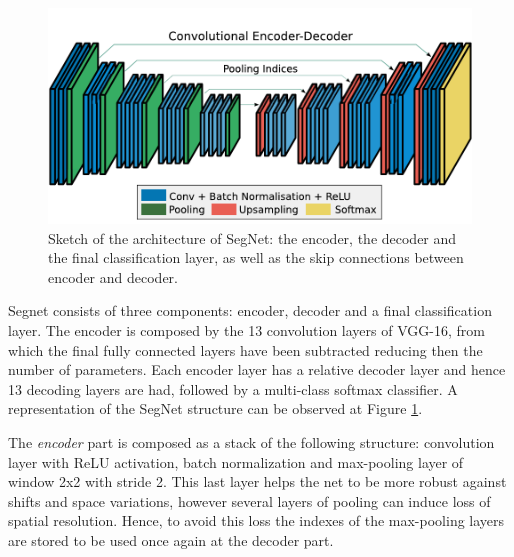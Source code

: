 \begin{figure}[!htbp]
\begin{center}
\includegraphics[scale=0.45]{seg_net.png}
\caption{Sketch of the architecture of SegNet: the encoder, the decoder and the final classification layer, as well as the skip connections between encoder and decoder.}
\label{segnet}
\end{center}
\end{figure}

Segnet consists of three components: encoder, decoder and a final classification layer. The encoder is composed by the 13 convolution layers of VGG-16, from which the final fully connected layers have been subtracted reducing then the number of parameters. Each encoder layer has a relative decoder layer and hence 13 decoding layers are had, followed by a multi-class softmax classifier. A representation of the SegNet structure can be observed at Figure \ref{segnet}.\newline

The \textit{encoder} part is composed as a stack of the following structure: convolution layer with ReLU activation, batch normalization and max-pooling layer of window 2x2 with stride 2. This last layer helps the net to be more robust against shifts and space variations, however several layers of pooling can induce loss of spatial resolution. Hence, to avoid this loss the indexes of the max-pooling layers are stored to be used once again at the decoder part. \newline

